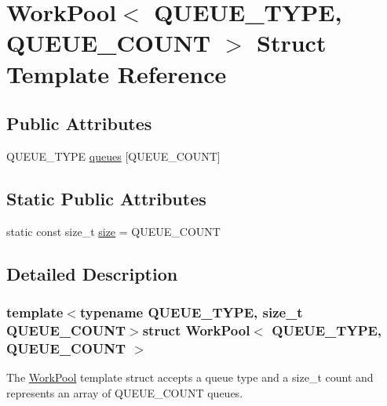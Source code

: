 \hypertarget{structWorkPool}{\section{Work\-Pool$<$ Q\-U\-E\-U\-E\-\_\-\-T\-Y\-P\-E, Q\-U\-E\-U\-E\-\_\-\-C\-O\-U\-N\-T $>$ Struct Template Reference}
\label{structWorkPool}
}
\subsection*{Public Attributes}
\begin{DoxyCompactItemize}
\item 
Q\-U\-E\-U\-E\-\_\-\-T\-Y\-P\-E \hyperlink{structWorkPool_a02a6dd42781845f370b959d06c3bfebd}{queues} \mbox{[}Q\-U\-E\-U\-E\-\_\-\-C\-O\-U\-N\-T\mbox{]}
\end{DoxyCompactItemize}
\subsection*{Static Public Attributes}
\begin{DoxyCompactItemize}
\item 
static const size\-\_\-t \hyperlink{structWorkPool_a95561c6d698b8a6bf0d791ea0ba229d7}{size} = Q\-U\-E\-U\-E\-\_\-\-C\-O\-U\-N\-T
\end{DoxyCompactItemize}


\subsection{Detailed Description}
\subsubsection*{template$<$typename Q\-U\-E\-U\-E\-\_\-\-T\-Y\-P\-E, size\-\_\-t Q\-U\-E\-U\-E\-\_\-\-C\-O\-U\-N\-T$>$struct Work\-Pool$<$ Q\-U\-E\-U\-E\-\_\-\-T\-Y\-P\-E, Q\-U\-E\-U\-E\-\_\-\-C\-O\-U\-N\-T $>$}

The {\ttfamily \hyperlink{structWorkPool}{Work\-Pool}} template struct accepts a queue type and a {\ttfamily size\-\_\-t} count and represents an array of {\ttfamily Q\-U\-E\-U\-E\-\_\-\-C\-O\-U\-N\-T} queues. 

